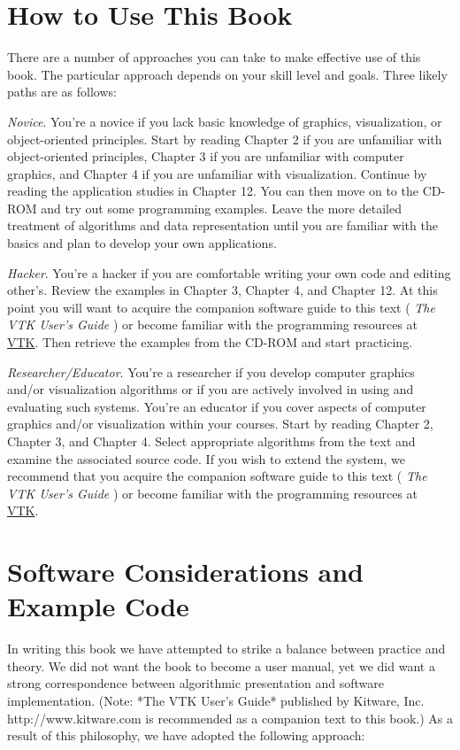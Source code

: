 \section{How to Use This Book}

There are a number of approaches you can take to make effective use of this book. The particular approach depends on your skill level and goals. Three likely paths are as follows:

\emph{Novice}. You're a novice if you lack basic knowledge of graphics, visualization, or object-oriented principles. Start by reading Chapter 2 if you are unfamiliar with object-oriented principles, Chapter 3 if you are unfamiliar with computer graphics, and Chapter 4 if you are unfamiliar with visualization. Continue by reading the application studies in Chapter 12. You can then move on to the CD-ROM and try out some programming examples. Leave the more detailed treatment of algorithms and data representation until you are familiar with the basics and plan to develop your own applications.

\emph{Hacker}. You're a hacker if you are comfortable writing your own code and editing other's. Review the examples in Chapter 3, Chapter 4, and Chapter 12. At this point you will want to acquire the companion software guide to this text ( \emph{The VTK User's Guide} ) or become familiar with the programming resources at \href{https://www.vtk.org/}{VTK}. Then retrieve the examples from the CD-ROM and start practicing.

\emph{Researcher/Educator}. You're a researcher if you develop computer graphics and/or visualization algorithms or if you are actively involved in using and evaluating such systems. You're an educator if you cover aspects of computer graphics and/or visualization within your courses. Start by reading Chapter 2, Chapter 3, and Chapter 4. Select appropriate algorithms from the text and examine the associated source code. If you wish to extend the system, we recommend that you acquire the companion software guide to this text ( \emph{The VTK User's Guide} ) or become familiar with the programming resources at \href{https://www.vtk.org/}{VTK}.

\section{Software Considerations and Example Code}

In writing this book we have attempted to strike a balance between practice and theory. We did not want the book to become a user manual, yet we did want a strong correspondence between algorithmic presentation and software implementation. (Note: *The VTK User's Guide* published by Kitware, Inc. http://www.kitware.com is recommended as a companion text to this book.) As a result of this philosophy, we have adopted the following approach:

